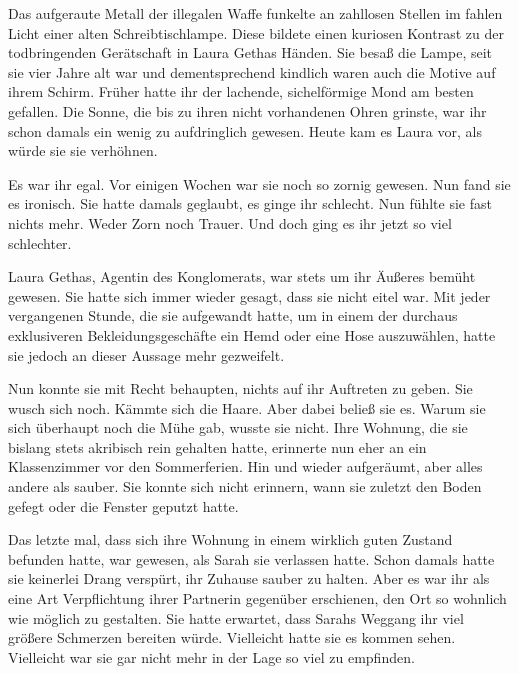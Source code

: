 Das aufgeraute Metall der illegalen Waffe funkelte an zahllosen Stellen im fahlen Licht einer alten Schreibtischlampe. 
Diese bildete einen kuriosen Kontrast zu der todbringenden Gerätschaft in Laura Gethas Händen. 
Sie besaß die Lampe, seit sie vier Jahre alt war und dementsprechend kindlich waren auch die Motive auf ihrem Schirm.
Früher hatte ihr der lachende, sichelförmige Mond am besten gefallen.
Die Sonne, die bis zu ihren nicht vorhandenen Ohren grinste, war ihr schon damals ein wenig zu aufdringlich gewesen.
Heute kam es Laura vor, als würde sie sie verhöhnen.

\par

Es war ihr egal.
Vor einigen Wochen war sie noch so zornig gewesen.
Nun fand sie es ironisch.
Sie hatte damals geglaubt, es ginge ihr schlecht.
Nun fühlte sie fast nichts mehr.
Weder Zorn noch Trauer.
Und doch ging es ihr jetzt so viel schlechter.

\par

Laura Gethas, Agentin des Konglomerats, war stets um ihr Äußeres bemüht gewesen.
Sie hatte sich immer wieder gesagt, dass sie nicht eitel war.
Mit jeder vergangenen Stunde, die sie aufgewandt hatte, um in einem der durchaus exklusiveren Bekleidungsgeschäfte ein Hemd oder eine Hose auszuwählen, hatte sie jedoch an dieser Aussage mehr gezweifelt.

\par

Nun konnte sie mit Recht behaupten, nichts auf ihr Auftreten zu geben.
Sie wusch sich noch.
Kämmte sich die Haare.
Aber dabei beließ sie es.
Warum sie sich überhaupt noch die Mühe gab, wusste sie nicht.
Ihre Wohnung, die sie bislang stets akribisch rein gehalten hatte, erinnerte nun eher an ein Klassenzimmer vor den Sommerferien.
Hin und wieder aufgeräumt, aber alles andere als sauber.
Sie konnte sich nicht erinnern, wann sie zuletzt den Boden gefegt oder die Fenster geputzt hatte.

\par

Das letzte mal, dass sich ihre Wohnung in einem wirklich guten Zustand befunden hatte, war gewesen, als Sarah sie verlassen hatte.
Schon damals hatte sie keinerlei Drang verspürt, ihr Zuhause sauber zu halten.
Aber es war ihr als eine Art Verpflichtung ihrer Partnerin gegenüber erschienen, den Ort so wohnlich wie möglich zu gestalten.
Sie hatte erwartet, dass Sarahs Weggang ihr viel größere Schmerzen bereiten würde.
Vielleicht hatte sie es kommen sehen.
Vielleicht war sie gar nicht mehr in der Lage so viel zu empfinden.

